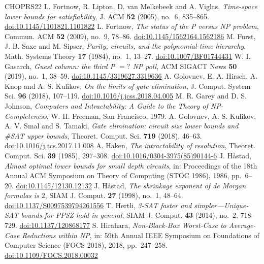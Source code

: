 \begin{thebibliography}{CHOPRS22}
 L. Fortnow, R. Lipton, D. van Melkebeek and A. Viglas, \emph{Time-space lower bounds for satisfiability}, J. ACM \textbf{52} (2005), no.~6, 835--865. \href{https://doi.org/10.1145/1101821.1101822}{doi:10.1145/1101821.1101822}
 L. Fortnow, \emph{The status of the P versus NP problem}, Commun. ACM \textbf{52} (2009), no.~9, 78--86. \href{https://doi.org/10.1145/1562164.1562186}{doi:10.1145/1562164.1562186}
 M. Furst, J. B. Saxe and M. Sipser, \emph{Parity, circuits, and the polynomial-time hierarchy}, Math. Systems Theory \textbf{17} (1984), no.~1, 13--27. \href{https://doi.org/10.1007/BF01744431}{doi:10.1007/BF01744431}
 W. I. Gasarch, \emph{Guest column: the third P $=?$ NP poll}, ACM SIGACT News \textbf{50} (2019), no.~1, 38--59. \href{https://doi.org/10.1145/3319627.3319636}{doi:10.1145/3319627.3319636}
 A. Golovnev, E. A. Hirsch, A. Knop and A. S. Kulikov, \emph{On the limits of gate elimination}, J. Comput. System Sci. \textbf{96} (2018), 107--119. \href{https://doi.org/10.1016/j.jcss.2018.04.005}{doi:10.1016/j.jcss.2018.04.005}
 M. R. Garey and D. S. Johnson, \emph{Computers and Intractability: A Guide to the Theory of NP-Completeness}, W. H. Freeman, San Francisco, 1979.
 A. Golovnev, A. S. Kulikov, A. V. Smal and S. Tamaki, \emph{Gate elimination: circuit size lower bounds and \#SAT upper bounds}, Theoret. Comput. Sci. \textbf{719} (2018), 46--63. \href{https://doi.org/10.1016/j.tcs.2017.11.008}{doi:10.1016/j.tcs.2017.11.008}
 A. Haken, \emph{The intractability of resolution}, Theoret. Comput. Sci. \textbf{39} (1985), 297--308. \href{https://doi.org/10.1016/0304-3975(85)90144-6}{doi:10.1016/0304-3975(85)90144-6}
 J. H{\aa}stad, \emph{Almost optimal lower bounds for small depth circuits}, in: Proceedings of the 18th Annual ACM Symposium on Theory of Computing (STOC 1986), 1986, pp.~6--20. \href{https://doi.org/10.1145/12130.12132}{doi:10.1145/12130.12132}
 J. H{\aa}stad, \emph{The shrinkage exponent of de Morgan formulas is $2$}, SIAM J. Comput. \textbf{27} (1998), no.~1, 48--64. \href{https://doi.org/10.1137/S0097539794261556}{doi:10.1137/S0097539794261556}
 T. Hertli, \emph{3-SAT faster and simpler---Unique-SAT bounds for PPSZ hold in general}, SIAM J. Comput. \textbf{43} (2014), no.~2, 718--729. \href{https://doi.org/10.1137/120868177}{doi:10.1137/120868177}
 S. Hirahara, \emph{Non-Black-Box Worst-Case to Average-Case Reductions within NP}, in: 59th Annual IEEE Symposium on Foundations of Computer Science (FOCS 2018), 2018, pp.~247--258. \href{https://doi.org/10.1109/FOCS.2018.00032}{doi:10.1109/FOCS.2018.00032}

\end{thebibliography}
